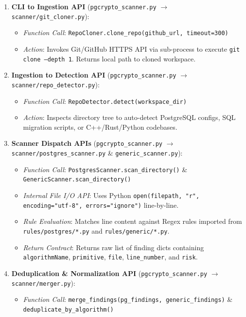 \documentclass[11pt,a4paper,landscape]{article}
\begin{document}
\begin{enumerate}
    \item \textbf{CLI to Ingestion API} (\texttt{pgcrypto\_scanner.py} $\rightarrow$ \texttt{scanner/git\_cloner.py}):
    \begin{itemize}
        \item \textit{Function Call}: \texttt{RepoCloner.clone\_repo(github\_url, timeout=300)}
        \item \textit{Action}: Invokes Git/GitHub HTTPS API via sub-process to execute \texttt{git clone --depth 1}. Returns local path to cloned workspace.
    \end{itemize}
    \item \textbf{Ingestion to Detection API} (\texttt{pgcrypto\_scanner.py} $\rightarrow$ \texttt{scanner/repo\_detector.py}):
    \begin{itemize}
        \item \textit{Function Call}: \texttt{RepoDetector.detect(workspace\_dir)}
        \item \textit{Action}: Inspects directory tree to auto-detect PostgreSQL configs, SQL migration scripts, or C++/Rust/Python codebases.
    \end{itemize}
    \item \textbf{Scanner Dispatch APIs} (\texttt{pgcrypto\_scanner.py} $\rightarrow$ \texttt{scanner/postgres\_scanner.py} \& \texttt{generic\_scanner.py}):
    \begin{itemize}
        \item \textit{Function Call}: \texttt{PostgresScanner.scan\_directory()} \& \texttt{GenericScanner.scan\_directory()}
        \item \textit{Internal File I/O API}: Uses Python \texttt{open(filepath, "r", encoding="utf-8", errors="ignore")} line-by-line.
        \item \textit{Rule Evaluation}: Matches line content against Regex rules imported from \texttt{rules/postgres/*.py} and \texttt{rules/generic/*.py}.
        \item \textit{Return Contract}: Returns raw list of finding dicts containing \texttt{algorithmName}, \texttt{primitive}, \texttt{file}, \texttt{line\_number}, and \texttt{risk}.
    \end{itemize}
    \item \textbf{Deduplication \& Normalization API} (\texttt{pgcrypto\_scanner.py} $\rightarrow$ \texttt{scanner/merger.py}):
    \begin{itemize}
        \item \textit{Function Call}: \texttt{merge\_findings(pg\_findings, generic\_findings)} \& \texttt{deduplicate\_by\_algorithm()}

\end{itemize}
\end{enumerate}
\end{document}
